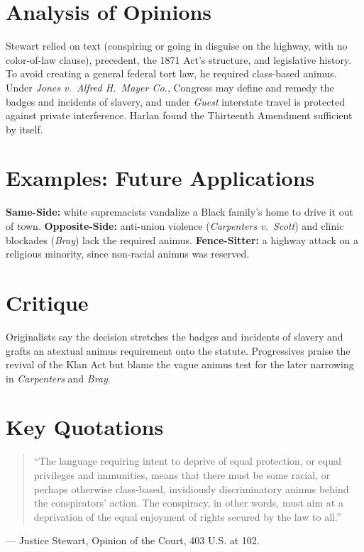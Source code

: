\documentclass[12pt]{article}
\begin{document}
\section{Analysis of Opinions}
Stewart relied on text (conspiring or going in disguise on the highway, with no color-of-law clause), precedent, the 1871 Act's structure, and legislative history. To avoid creating a general federal tort law, he required class-based animus. Under \textit{Jones v.\ Alfred H.\ Mayer Co.}, Congress may define and remedy the badges and incidents of slavery, and under \textit{Guest} interstate travel is protected against private interference. Harlan found the Thirteenth Amendment sufficient by itself.

\section{Examples: Future Applications}
\textbf{Same-Side:} white supremacists vandalize a Black family's home to drive it out of town. \textbf{Opposite-Side:} anti-union violence (\textit{Carpenters v.\ Scott}) and clinic blockades (\textit{Bray}) lack the required animus. \textbf{Fence-Sitter:} a highway attack on a religious minority, since non-racial animus was reserved.

\section{Critique}
Originalists say the decision stretches the badges and incidents of slavery and grafts an atextual animus requirement onto the statute. Progressives praise the revival of the Klan Act but blame the vague animus test for the later narrowing in \textit{Carpenters} and \textit{Bray}.

\section{Key Quotations}
\begin{quote}
``The language requiring intent to deprive of equal protection, or equal privileges and immunities, means that there must be some racial, or perhaps otherwise class-based, invidiously discriminatory animus behind the conspirators' action. The conspiracy, in other words, must aim at a deprivation of the equal enjoyment of rights secured by the law to all.''
\end{quote}
\noindent --- Justice Stewart, Opinion of the Court, 403 U.S. at 102.
\end{document}
